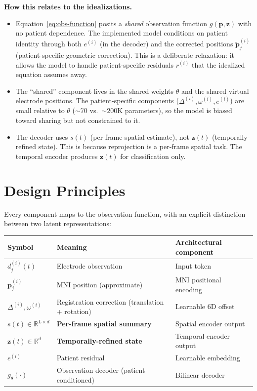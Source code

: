 \documentclass[11pt,letterpaper]{article}
\newcommand{\bfp}{\mathbf{p}}
\newcommand{\bfz}{\mathbf{z}}
\newcommand{\R}{\mathbb{R}}
\begin{document}
\textbf{How this relates to the idealizations.}
\begin{itemize}[leftmargin=2em]
\item Equation~\eqref{eq:obs-function} posits a \emph{shared} observation function $g(\bfp, \bfz)$ with no patient dependence. The implemented model conditions on patient identity through both $e^{(i)}$ (in the decoder) and the corrected positions $\tilde{\bfp}_j^{(i)}$ (patient-specific geometric correction). This is a deliberate relaxation: it allows the model to handle patient-specific residuals $r^{(i)}$ that the idealized equation assumes away.
\item The ``shared'' component lives in the shared weights $\theta$ and the shared virtual electrode positions. The patient-specific components ($\Delta^{(i)}, \omega^{(i)}, e^{(i)}$) are small relative to $\theta$ (${\sim}70$ vs.\ ${\sim}200$K parameters), so the model is biased toward sharing but not constrained to it.
\item The decoder uses $s(t)$ (per-frame spatial estimate), not $\bfz(t)$ (temporally-refined state). This is because reprojection is a per-frame spatial task. The temporal encoder produces $\bfz(t)$ for classification only.
\end{itemize}


\section{Design Principles}

Every component maps to the observation function, with an explicit distinction between two latent representations:

\begin{table}[ht!]\centering\small
\begin{tabular}{@{}lll@{}}
\toprule
\textbf{Symbol} & \textbf{Meaning} & \textbf{Architectural component} \\
\midrule
$d_j^{(i)}(t)$ & Electrode observation & Input token \\
$\bfp_j^{(i)}$ & MNI position (approximate) & MNI positional encoding \\
$\Delta^{(i)}, \omega^{(i)}$ & Registration correction (translation + rotation) & Learnable 6D offset \\
$s(t) \in \R^{L \times d}$ & \textbf{Per-frame spatial summary} & Spatial encoder output \\
$\bfz(t) \in \R^d$ & \textbf{Temporally-refined state} & Temporal encoder output \\
$e^{(i)}$ & Patient residual & Learnable embedding \\
$g_\theta(\cdot)$ & Observation decoder (patient-conditioned) & Bilinear decoder \\
\bottomrule
\end{tabular}
\end{table}
\end{document}
